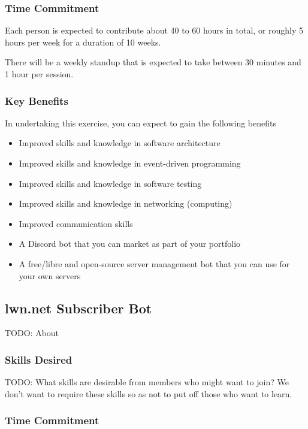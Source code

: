 \documentclass[11pt,fleqn]{article}
\begin{document}
\subsubsection*{Time Commitment}

Each person is expected to contribute about 40 to 60 hours in total, or roughly 5 hours per week for a duration of 10 weeks.

There will be a weekly standup that is expected to take between 30 minutes and 1 hour per session.

\subsubsection*{Key Benefits}

In undertaking this exercise, you can expect to gain the following benefits

\begin{itemize}
    \item Improved skills and knowledge in software architecture
    \item Improved skills and knowledge in event-driven programming
    \item Improved skills and knowledge in software testing
    \item Improved skills and knowledge in networking (computing)
    \item Improved communication skills
    \item A Discord bot that you can market as part of your portfolio
    \item A free/libre and open-source server management bot that you can use for your own servers
\end{itemize}

\subsection{lwn.net Subscriber Bot}

TODO: About

\subsubsection*{Skills Desired}

TODO: What skills are desirable from members who might want to join?  We don't want to require these skills so as not to put off those who want to learn.

\subsubsection*{Time Commitment}
\end{document}

